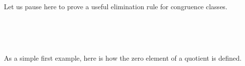 \documentclass[a4paper,UKenglish,cleveref,autoref,thm-restate,11pt]{lipics-v2021}
\begin{document}
\ccpad
Let us pause here to prove a useful elimination rule for congruence classes.
\ccpad
\begin{code}%
\>[1]\AgdaSpace{}%
\AgdaSymbol{:}
\>[200I]\AgdaSymbol{(}\AgdaSpace{}%
\AgdaSymbol{:}\AgdaSpace{}%
\AgdaSpace{}%
\AgdaSpace{}%
\AgdaSymbol{)\{}\AgdaSpace{}%
\AgdaSymbol{:}\AgdaSpace{}%
\AgdaSymbol{\{}\AgdaSymbol{\}\{}\AgdaSymbol{\}}\AgdaSpace{}%
\AgdaSymbol{\}\{}\AgdaSpace{}%
\AgdaSpace{}%
\AgdaSymbol{:}\AgdaSpace{}%
\AgdaSpace{}%
\AgdaSpace{}%
\AgdaSymbol{\}}\<%
\\
\>[1][@{}l@{\AgdaIndent{0}}]%
\>[2]%
\>[.][@{}l@{}]\<[200I]%
\>[10]\AgdaSpace{}%
\AgdaSpace{}%
\AgdaSymbol{\{}\AgdaSpace{}%
\AgdaSpace{}%
\AgdaSymbol{\}}\AgdaSpace{}%
\AgdaSpace{}%
\AgdaSpace{}%
\AgdaSpace{}%
\AgdaSpace{}%
\AgdaSpace{}%
\AgdaSpace{}%
\AgdaSpace{}%
\AgdaSpace{}%
\AgdaSpace{}%
\<%
\\
%
\\[\AgdaEmptyExtraSkip]%
%
\>[1]\AgdaSpace{}%
\AgdaSpace{}%
\AgdaSymbol{\{}\AgdaSymbol{\}}\AgdaSpace{}%
\AgdaSpace{}%
\AgdaSymbol{=}\AgdaSpace{}%
\AgdaSpace{}%
\AgdaSymbol{(}\AgdaSpace{}%
\AgdaSymbol{)}\AgdaSpace{}%
\AgdaSymbol{\AgdaUnderscore{}}\<%
\end{code}
\ccpad
As a simple first example, here is how the zero element of a quotient is defined.
\ccpad
\end{document}
